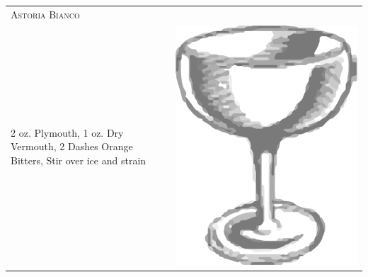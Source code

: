 \documentclass{article}
\begin{document}
\begin{tabular}{p{2in} p{0.5in}}
	\multicolumn{2}{p{3in}}{\centering\Huge\textsc{Astoria Bianco}}\\ 
	  \vspace{-0.1in}2 oz. Plymouth, 1 oz. Dry Vermouth, 2 Dashes Orange Bitters, Stir over ice and strain &
	  \vspace{-0.1in} \includegraphics{egg_coupe.png}
\end{tabular}\\
\end{document}
